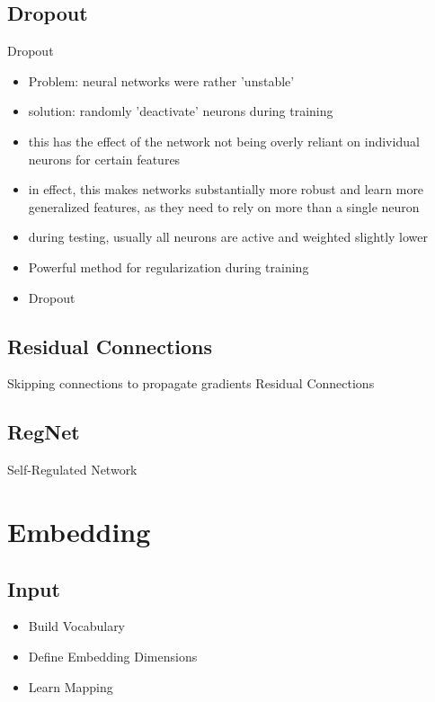 \subsection{Dropout}
\begin{frame}[c]{Dropout}
    \begin{itemize}
        \item Problem: neural networks were rather 'unstable'
        \item solution: randomly 'deactivate' neurons during training
        \item this has the effect of the network not being overly reliant on individual neurons for certain features
        \item in effect, this makes networks substantially more robust and learn more generalized features, as they need to rely on more than a single neuron
        \item during testing, usually all neurons are active and weighted slightly lower
        \item Powerful method for regularization during training
        \item Dropout \cite{srivastava_dropout_2014}
    \end{itemize}
\end{frame}

\subsection{Residual Connections}
\begin{frame}[c]
    Skipping connections to propagate gradients
    Residual Connections \cite{he_deep_2016}
\end{frame}

\subsection{RegNet}

\begin{frame}[c]
    Self-Regulated Network \cite{xu_regnet_2021}
\end{frame}


\section{Embedding}
\subsection{Input}
\begin{frame}[c]
    \begin{itemize}[<+(1)->]
        \item Build Vocabulary
        \item Define Embedding Dimensions
        \item Learn Mapping
    \end{itemize}
\end{frame}

